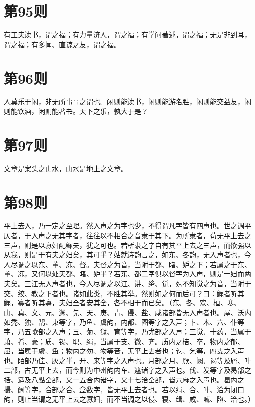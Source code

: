 \documentclass[12pt,a4paper]{ctexbook}
\begin{document}
\section{第95则}
有工夫读书，谓之福；有力量济人，谓之福；有学问著述，谓之福；无是非到耳，谓之福；有多闻、直谅之友，谓之福。\par

\section{第96则}
人莫乐于闲，非无所事事之谓也。闲则能读书，闲则能游名胜，闲则能交益友，闲则能饮酒，闲则能著书。天下之乐，孰大于是？\par

\section{第97则}
文章是案头之山水，山水是地上之文章。\par

\section{第98则}
平上去入，乃一定之至理。然入声之为字也少，不得谓凡字皆有四声也。世之调平仄者，于入声之无其字者，往往以不相合之音隶于其下。为所隶者，苟无平上去之三声，则是以寡妇配鳏夫，犹之可也。若所隶之字自有其平上去之三声，而欲强以从我，则是干有夫之妇矣，其可乎？姑就诗韵言之，如东、冬韵，无入声者也，今人尽调之以东、董、冻、督。夫督之为音，当附于都、睹、妒之下；若属之于东、董、冻，又何以处夫都、睹、妒乎？若东、都二字俱以督字为入声，则是一妇而两夫矣。三江无入声者也，今人尽调之以江、讲、绛、觉，殊不知觉之为音，当附于交、绞、教之下者也。诸如此类，不胜其举。然则如之何而后可？曰：鳏者听其鳏，寡者听其寡，夫妇全者安其全，各不相干而已矣。（东、冬、欢、桓、寒、山、真、文、元、渊、先、天、庚、青、侵、盐、咸诸部皆无入声者也。屋、沃内如秃、独、鹄、束等字，乃鱼、虞韵，内都、图等字之入声；卜、木、六、仆等字，乃五歌部之入声；玉、菊、狱、育等字，乃尤部之入声；三觉、十药，当属于萧、肴、豪；质、锡、职、缉，当属于支、微、齐。质内之桔、卒，物内之郁、屈，当属于虞、鱼；物内之勿、物等音，无平上去者也；讫、乞等，四支之入声也。陌部乃佳、灰之半，开、来等字之入声也。月部之月、厥、阙、谒等及屑、叶二部，古无平上去，而今则为中州韵内车、遮诸字之入声也。伐、发等字及曷部之括、适及八黠全部，又十五合内诸字，又十七洽全部，皆六麻之入声也。曷内之撮、阔等字，合部之合、盒数字，皆无平上去者也。若以缉、合、叶、洽为闭口韵，则止当谓之无平上去之寡妇，而不当调之以侵、寝、缉、咸、喊、陷、洽也。）\par
\end{document}
